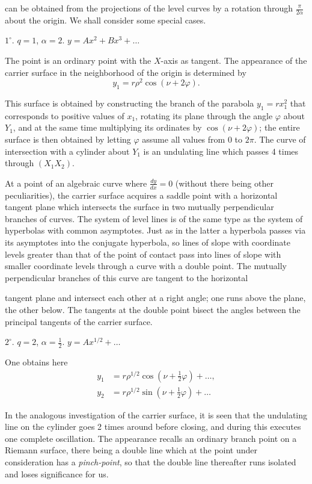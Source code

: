 \documentclass{article}
\begin{document}
can be obtained from the projections of the level curves by a rotation through $\frac{\pi}{2\alpha}$ about the origin. We shall consider some special cases.

$1^\circ$. $q = 1$, $\alpha = 2$. $y = A x^2 + B x^3 + \dots$

The point is an ordinary point with the $X$-axis as tangent. The appearance of the carrier surface in the neighborhood of the origin is determined by
\[
y_1 = r \rho^2 \cos (\nu + 2\varphi).
\]

This surface is obtained by constructing the branch of the parabola $y_1 = r x_1^2$ that corresponds to positive values of $x_1$, rotating its plane through the angle $\varphi$ about $Y_1$, and at the same time multiplying its ordinates by $\cos (\nu + 2\varphi)$; the entire surface is then obtained by letting $\varphi$ assume all values from 0 to $2\pi$. The curve of intersection with a cylinder about $Y_1$ is an undulating line which passes 4 times through $(X_1 X_2)$.

At a point of an algebraic curve where $\frac{dy}{dx} = 0$ (without there being other peculiarities), the carrier surface acquires a saddle point with a horizontal tangent plane which intersects the surface in two mutually perpendicular branches of curves. The system of level lines is of the same type as the system of hyperbolas with common asymptotes. Just as in the latter a hyperbola passes via its asymptotes into the conjugate hyperbola, so lines of slope with coordinate levels greater than that of the point of contact pass into lines of slope with smaller coordinate levels through a curve with a double point. The mutually perpendicular branches of this curve are tangent to the horizontal

tangent plane and intersect each other at a right angle; one runs above the plane, the other below. The tangents at the double point bisect the angles between the principal tangents of the carrier surface.

$2^\circ$. $q = 2$, $\alpha = \frac{1}{2}$. $y = A x^{1/2} + \dots$

One obtains here
\[
\begin{aligned}
y_1 &= r \rho^{1/2} \cos \left(\nu + \frac{1}{2}\varphi\right) + \dots, \\
y_2 &= r \rho^{1/2} \sin \left(\nu + \frac{1}{2}\varphi\right) + \dots
\end{aligned}
\]

In the analogous investigation of the carrier surface, it is seen that the undulating line on the cylinder goes 2 times around before closing, and during this executes one complete oscillation. The appearance recalls an ordinary branch point on a Riemann surface, there being a double line which at the point under consideration has a \emph{pinch-point}, so that the double line thereafter runs isolated and loses significance for us.
\end{document}

